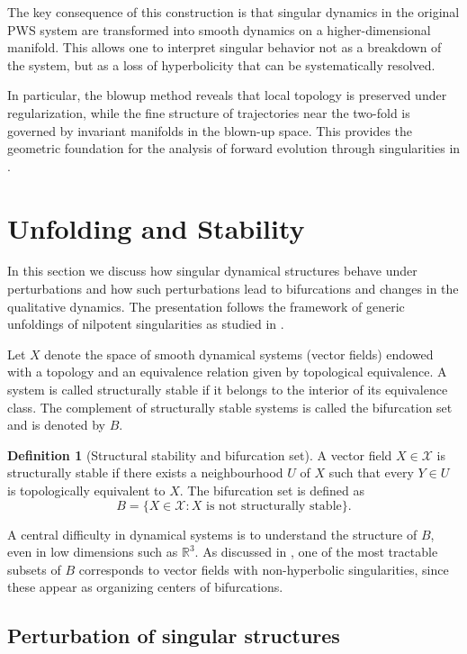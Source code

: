 \documentclass[12pt, a4paper, oneside]{book}
\theoremstyle{plain}
\theoremstyle{definition}
\newtheorem{definition}[theorem]{Definition}
\theoremstyle{remark}
\theoremstyle{definition}
\begin{document}
The key consequence of this construction is that singular dynamics in the original PWS system are transformed into smooth dynamics on a higher-dimensional manifold. This allows one to interpret singular behavior not as a breakdown of the system, but as a loss of hyperbolicity that can be systematically resolved.

In particular, the blowup method reveals that local topology is preserved under regularization, while the fine structure of trajectories near the two-fold is governed by invariant manifolds in the blown-up space. This provides the geometric foundation for the analysis of forward evolution through singularities in \cite{kristiansen2019resolution}.

\section{Unfolding and Stability}

In this section we discuss how singular dynamical structures behave under perturbations and how such perturbations lead to bifurcations and changes in the qualitative dynamics. The presentation follows the framework of generic unfoldings of nilpotent singularities as studied in \cite{ibanez2005shil}.

Let $X$ denote the space of smooth dynamical systems (vector fields) endowed with a topology and an equivalence relation given by topological equivalence. A system is called structurally stable if it belongs to the interior of its equivalence class. The complement of structurally stable systems is called the bifurcation set and is denoted by $B$.

\begin{definition}[Structural stability and bifurcation set]
A vector field $X \in \mathcal{X}$ is structurally stable if there exists a neighbourhood $U$ of $X$ such that every $Y \in U$ is topologically equivalent to $X$. The bifurcation set is defined as
\[
B = \{ X \in \mathcal{X} : X \text{ is not structurally stable} \}.
\]
\end{definition}

A central difficulty in dynamical systems is to understand the structure of $B$, even in low dimensions such as $\mathbb{R}^3$. As discussed in \cite{ibanez2005shil}, one of the most tractable subsets of $B$ corresponds to vector fields with non-hyperbolic singularities, since these appear as organizing centers of bifurcations.

\subsection{Perturbation of singular structures}
\end{document}
